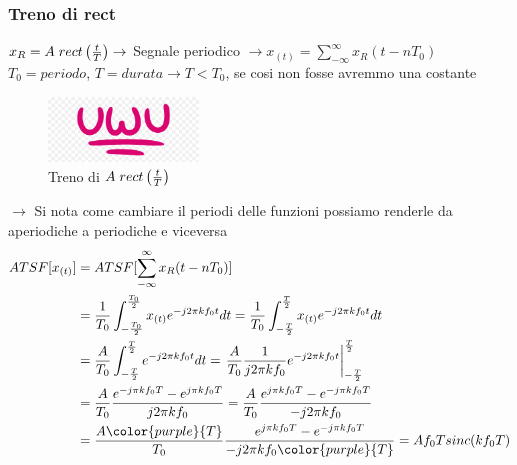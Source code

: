             \subsubsection{Treno di rect}
                $x_R=A\hspace{0.1cm}rect\left(\frac{t}{T}\right)\rightarrow$ Segnale periodico $\rightarrow x_{(t)} = \sum_{-\infty}^{\infty} x_R (t-nT_0)$\\
                $T_0 = periodo$, $T = durata \rightarrow T < T_0$, se cosi non fosse avremmo una costante
                \begin{figure}[H]
                    \centering
                    \includegraphics[width=4cm]{media/uwu.png}
                    \caption{Treno di $A\hspace{0.1cm}rect\left(\frac{t}{T}\right)$}
                    \label{fig:treno di rect}
                \end{figure}                
                $\rightarrow$ Si nota come cambiare il periodi delle funzioni possiamo renderle da aperiodiche a periodiche e viceversa
                \begin{align}
                    ATSF[x_{(t)}] & = ATSF[\sum_{-\infty}^{\infty} x_R (t-nT_0)] \nonumber \\
                        & = \frac{1}{T_0} \int_{-\frac{T_0}{2}}^{\frac{T_0}{2}} x_{(t)} e^{-j2\pi kf_0t} dt = \frac{1}{T_0} \int_{-\frac{T}{2}}^{\frac{T}{2}} x_{(t)} e^{-j2\pi kf_0t} dt \nonumber \\
                        & = \frac{A}{T_0} \int_{-\frac{T}{2}}^{\frac{T}{2}} e^{-j2\pi kf_0t} dt = \eval{\frac{A}{T_0} \frac{1}{j2\pi kf_0} e^{-j2\pi kf_0t}}_{-\frac{T}{2}}^{\frac{T}{2}} \nonumber \\
                        & = \frac{A}{T_0} \frac{e^{-j\pi kf_0T} - e^{j\pi kf_0T}}{j2\pi kf_0} = \frac{A}{T_0} \frac{e^{j\pi kf_0T}-e^{-j\pi kf_0T}}{-j2\pi kf_0} \nonumber \\
                        & = \frac{A\color{purple}{T}}{T_0} \frac{e^{j\pi kf_0T}-e^{-j\pi kf_0T}}{-j2\pi kf_0\color{purple}{T}} = Af_0T sinc(kf_0T) \nonumber 
                \end{align}
